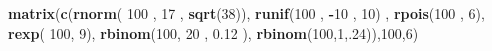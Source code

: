 \documentclass[]{article}
\newenvironment{Shaded}{\begin{snugshade}}{\end{snugshade}}
\newcommand{\KeywordTok}[1]{\textcolor[rgb]{0.13,0.29,0.53}{\textbf{#1}}}
\newcommand{\DecValTok}[1]{\textcolor[rgb]{0.00,0.00,0.81}{#1}}
\newcommand{\FloatTok}[1]{\textcolor[rgb]{0.00,0.00,0.81}{#1}}
\newcommand{\OperatorTok}[1]{\textcolor[rgb]{0.81,0.36,0.00}{\textbf{#1}}}
\newcommand{\NormalTok}[1]{#1}
\begin{document}
\begin{Shaded}
\begin{Highlighting}[]
\KeywordTok{matrix}\NormalTok{(}\KeywordTok{c}\NormalTok{(}\KeywordTok{rnorm}\NormalTok{( }\DecValTok{100}\NormalTok{ , }\DecValTok{17}\NormalTok{ , }\KeywordTok{sqrt}\NormalTok{(}\DecValTok{38}\NormalTok{)),  }\KeywordTok{runif}\NormalTok{(}\DecValTok{100}\NormalTok{ , }\OperatorTok{-}\DecValTok{10}\NormalTok{ , }\DecValTok{10}\NormalTok{) , }\KeywordTok{rpois}\NormalTok{(}\DecValTok{100}\NormalTok{ , }\DecValTok{6}\NormalTok{), }\KeywordTok{rexp}\NormalTok{( }\DecValTok{100}\NormalTok{, }\DecValTok{9}\NormalTok{), }
   \KeywordTok{rbinom}\NormalTok{(}\DecValTok{100}\NormalTok{, }\DecValTok{20}\NormalTok{ , }\FloatTok{0.12}\NormalTok{ ), }\KeywordTok{rbinom}\NormalTok{(}\DecValTok{100}\NormalTok{,}\DecValTok{1}\NormalTok{,.}\DecValTok{24}\NormalTok{)),}\DecValTok{100}\NormalTok{,}\DecValTok{6}\NormalTok{)}
\end{Highlighting}
\end{Shaded}
\end{document}
